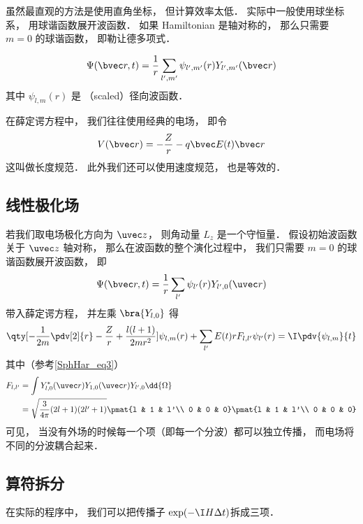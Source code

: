

虽然最直观的方法是使用直角坐标， 但计算效率太低． 实际中一般使用球坐标系， 用球谐函数展开波函数． 如果 Hamiltonian 是轴对称的， 那么只需要 $m = 0$ 的球谐函数， 即勒让德多项式．

\begin{equation}
\Psi(\bvec r, t) = \frac{1}{r}\sum_{l',m'} \psi_{l',m'}(r) Y_{l',m'}(\bvec r)
\end{equation}
其中 $\psi_{l,m}(r)$ 是 （scaled）径向波函数．

在薛定谔方程中， 我们往往使用经典的电场， 即令
\begin{equation}
V(\bvec r) = -\frac{Z}{r} - q\bvec E(t) \bvec r
\end{equation}
这叫做长度规范．%
此外我们还可以使用速度规范， 也是等效的．%

\subsection{线性极化场}
若我们取电场极化方向为 $\uvec z$， 则角动量 $L_z$ 是一个守恒量． 假设初始波函数关于 $\uvec z$ 轴对称， 那么在波函数的整个演化过程中， 我们只需要 $m=0$ 的球谐函数展开波函数， 即
\begin{equation}
\Psi(\bvec r, t) = \frac{1}{r}\sum_{l'} \psi_{l'}(r) Y_{l', 0}(\uvec r)
\end{equation}
带入薛定谔方程， 并左乘 $\bra{Y_{l,0}}$ 得
\begin{equation}
\qty[ -\frac{1}{2m} \pdv[2]{r} -\frac{Z}{r} + \frac{l(l+1)}{2mr^2}]\psi_{l,m}(r) + \sum_{l'} E(t)rF_{l, l'} \psi_{l'}(r) = \I \pdv{\psi_{l,m}}{t}
\end{equation}
其中（参考\autoref{SphHar_eq3}）
\begin{equation}
\begin{aligned}
F_{l,l'} &= \int Y_{l,0}^*(\uvec r) Y_{1,0}(\uvec r) Y_{l',0} \dd{\Omega}\\
&= \sqrt{\frac{3}{4\pi} (2l+1)(2l'+1)} \pmat{l & 1 & l'\\ 0 & 0 & 0}\pmat{l & 1 & l'\\ 0 & 0 & 0}
\end{aligned}
\end{equation}
可见， 当没有外场的时候每一个项（即每一个分波）都可以独立传播， 而电场将不同的分波耦合起来．

\subsection{算符拆分}
在实际的程序中， 我们可以把传播子 $\exp(-\I H \Delta t)$拆成三项．
\begin{equation}

\end{equation}


